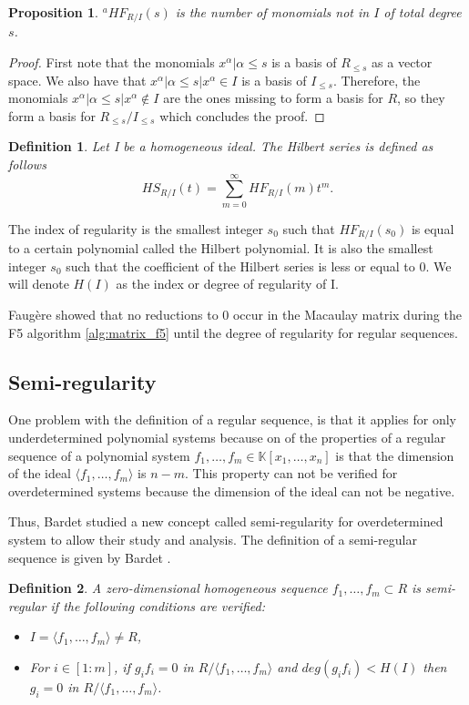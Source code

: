\documentclass[english]{article}
\newtheorem{proposition}{Proposition}[section]
\newtheorem{definition}{Definition}[section]
\begin{document}
		\begin{proposition}
			${}^a HF_{R/I}(s)$ is the number of monomials not in $I$ of total degree $s$.
		\end{proposition}
		\begin{proof}
			First note that the monomials ${x^\alpha | \alpha \leq s}$ is a basis of $R_{\leq s}$ as a vector space. We also have that ${x^\alpha | \alpha \leq s | x^\alpha \in I}$ is a basis of $I_{\leq s}$. Therefore, the monomials ${x^\alpha | \alpha \leq s | x^\alpha \notin I}$ are the ones missing to form a basis for $R$, so they form a basis for $R_{\leq s} / I_{\leq s}$ which concludes the proof.
		\end{proof}
		
		\begin{definition}
			Let I be a homogeneous ideal. The Hilbert series is defined as follows
			$$
					HS_{R/I}(t) = \sum_{m=0}^{\infty} HF_{R/I}(m) t^m.
			$$	
		\end{definition}
		
		The index of regularity is the smallest integer $s_0$ such that $HF_{R/I}(s_0)$ is equal to a certain polynomial called the Hilbert polynomial. It is also the smallest integer $s_0$ such that the coefficient of the Hilbert series is less or equal to 0. We will denote $H(I)$ as the index or degree of regularity of I.
		
		Faugère showed that no reductions to 0 occur in the Macaulay matrix during the F5 algorithm \ref{alg:matrix_f5} until the degree of regularity \cite{F02} for regular sequences.
		
		\subsection{Semi-regularity}
		One problem with the definition of a regular sequence, is that it applies for only underdetermined  polynomial systems because on of the properties of a regular sequence of a polynomial system $f_1,\dots,f_m \in \mathbb{K}[x_1,\dots,x_n]$ is that the dimension of the ideal $\langle f_1,\dots,f_m \rangle$ is $n - m$. This property can not be verified for overdetermined systems because the dimension of the ideal can not be negative.
		
		Thus, Bardet studied a new concept called semi-regularity for overdetermined system to allow their study and analysis. The definition of a semi-regular sequence is given by Bardet \cite{Bardet04}.
		
		\begin{definition}
			A zero-dimensional homogeneous sequence $f_1,\dots,f_m \subset R$ is semi-regular if the following conditions are verified:
			\begin{itemize}
				\item $I = \langle f_1,\dots,f_m \rangle \neq R$,
				\item For $i \in [1:m]$, if $g_if_i = 0$ in $R/\langle f_1,\dots,f_m \rangle$ and $deg(g_if_i) < H(I)$ then $g_i = 0$ in $R/\langle f_1,\dots,f_m \rangle$.
			\end{itemize} 
		\end{definition}
		
\end{document}
